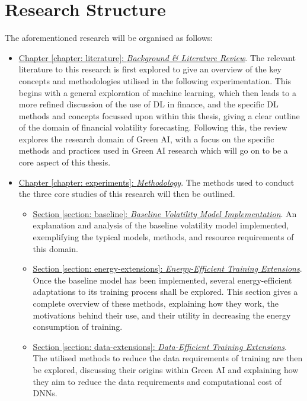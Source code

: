 \documentclass[a4paper, 11pt]{report}
\begin{document}
    \section{Research Structure}
    \label{section: structure}

    The aforementioned research will be organised as follows: 

    \begin{itemize}
        \item \underline{Chapter \ref{chapter: literature}: \emph{Background \& Literature Review}}. The relevant literature to this research is first explored to give an overview of the key concepts and methodologies utilised in the following experimentation. This begins with a general exploration of machine learning, which then leads to a more refined discussion of the use of DL in finance, and the specific DL methods and concepts focussed upon within this thesis, giving a clear outline of the domain of financial volatility forecasting. Following this, the review explores the research domain of Green AI, with a focus on the specific methods and practices used in Green AI research which will go on to be a core aspect of this thesis.
        
        \item \underline{Chapter \ref{chapter: experiments}: \emph{Methodology}}. The methods used to conduct the three core studies of this research will then be outlined.
        \begin{itemize}
            \item \underline{Section \ref{section: baseline}: \emph{Baseline Volatility Model Implementation}}. An explanation and analysis of the baseline volatility model implemented, exemplifying the typical models, methods, and resource requirements of this domain.

            \item \underline{Section \ref{section: energy-extensions}: \emph{Energy-Efficient Training Extensions}}. Once the baseline model has been implemented, several energy-efficient adaptations to its training process shall be explored. This section gives a complete overview of these methods, explaining how they work, the motivations behind their use, and their utility in decreasing the energy consumption of training.
            
            \item \underline{Section \ref{section: data-extensions}: \emph{Data-Efficient Training Extensions}}. The utilised methods to reduce the data requirements of training are then be explored, discussing their origins within Green AI and explaining how they aim to reduce the data requirements and computational cost of DNNs.
        \end{itemize}
        

\end{itemize}
\end{document}
